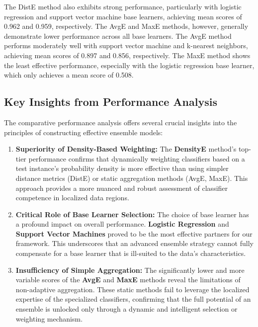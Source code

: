 \documentclass[lettersize,journal]{IEEEtran}
\begin{document}
	The DistE method also exhibits strong performance, particularly with
	logistic regression and support vector machine base learners, achieving mean
	scores of 0.962 and 0.959, respectively. The AvgE and MaxE methods, however, generally demonstrate lower performance across all base learners. The
	AvgE method performs moderately well with support vector machine and
	k-nearest neighbors, achieving mean scores of 0.897 and 0.856, respectively.
	The MaxE method shows the least effective performance, especially with the
	logistic regression base learner, which only achieves a mean score of 0.508.
	
	\subsection{Key Insights from Performance Analysis}
	
	The comparative performance analysis offers several crucial insights into the principles of constructing effective ensemble models:
	
	\begin{enumerate}
		\item \textbf{Superiority of Density-Based Weighting:} The \textbf{DensityE} method's top-tier performance confirms that dynamically weighting classifiers based on a test instance's probability density is more effective than using simpler distance metrics (DistE) or static aggregation methods (AvgE, MaxE). This approach provides a more nuanced and robust assessment of classifier competence in localized data regions.
		
		\item \textbf{Critical Role of Base Learner Selection:} The choice of base learner has a profound impact on overall performance. \textbf{Logistic Regression} and \textbf{Support Vector Machines} proved to be the most effective partners for our framework. This underscores that an advanced ensemble strategy cannot fully compensate for a base learner that is ill-suited to the data's characteristics.
		
		\item \textbf{Insufficiency of Simple Aggregation:} The significantly lower and more variable scores of the \textbf{AvgE} and \textbf{MaxE} methods reveal the limitations of non-adaptive aggregation. These static methods fail to leverage the localized expertise of the specialized classifiers, confirming that the full potential of an ensemble is unlocked only through a dynamic and intelligent selection or weighting mechanism.
	\end{enumerate}
	
\end{document}
